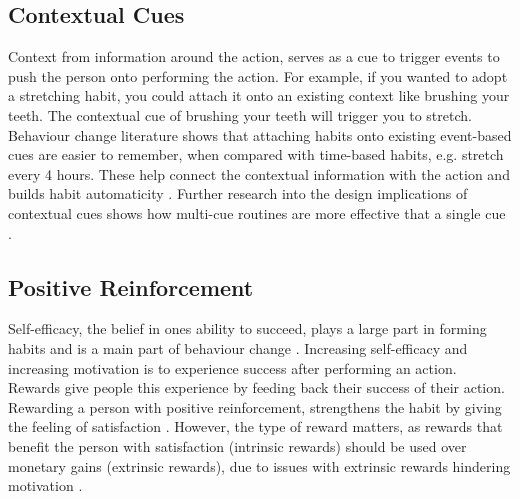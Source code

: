 \subsection*{Contextual Cues}
Context from information around the action, serves as a cue to trigger events to push the person onto performing the action. For example, if you wanted to adopt a stretching habit, you could attach it onto an existing context like brushing your teeth. The contextual cue of brushing your teeth will trigger you to stretch. Behaviour change literature \cite{article_implementation_intentions_multicue} shows that attaching habits onto existing event-based cues are easier to remember, when compared with time-based habits, e.g. stretch every 4 hours. These help connect the contextual information with the action and builds habit automaticity \cite{article_implementation_intentions}. Further research into the design implications of contextual cues shows how multi-cue routines are more effective that a single cue \cite{article_understanding_use_contextual_cues_design_impl}.

\subsection*{Positive Reinforcement}
Self-efficacy, the belief in ones ability to succeed, plays a large part in forming habits and is a main part of behaviour change \cite{article_a_self_efficacy}. Increasing self-efficacy and increasing motivation is to experience success after performing an action. Rewards give people this experience by feeding back their success of their action. Rewarding a person with positive reinforcement, strengthens the habit by giving the feeling of satisfaction \cite{article_promoting_habit_formation}. However, the type of reward matters, as rewards that benefit the person with satisfaction (intrinsic rewards) should be used over monetary gains (extrinsic rewards), due to issues with extrinsic rewards hindering motivation \cite{article_meta_analytic_review_intrinsic_motivation}.

